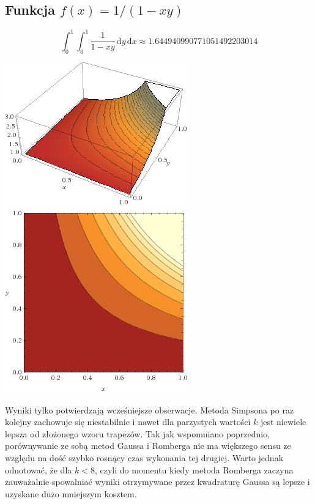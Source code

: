 \documentclass[11pt,leqno]{article}
\newcommand{\dvar}[1]{\,\mathrm{d}#1}
\begin{document}
\subsection{Funkcja $f(x) = 1 / (1 - xy) $}
\[
  \int_{0}^{1} \int_{0}^{1} \frac{1}{1 - xy} \dvar{y} \dvar{x}
\approx
  1.644940990771051492203014
\]
\begin{center}
\includegraphics[scale=0.65,natwidth=640,natheight=480]{gfx/testa4g.png}
\includegraphics[scale=0.65,natwidth=640,natheight=480]{gfx/testa4p.png}\\
\end{center}

Wyniki tylko potwierdzają wcześniejsze obserwacje. Metoda Simpsona po raz kolejny zachowuje się niestabilnie i nawet dla parzystych wartości $k$ jest niewiele lepsza od złożonego wzoru trapezów. Tak jak wspomniano poprzednio, porównywanie ze sobą metod Gaussa i Romberga nie ma większego sensu ze względu na dość szybko rosnący czas wykonania tej drugiej. Warto jednak odnotować, że dla $k < 8$, czyli do momentu kiedy metoda Romberga zaczyna zauważalnie spowalniać wyniki otrzymywane przez kwadraturę Gaussa są lepsze i uzyskane dużo mniejszym kosztem.
\end{document}
